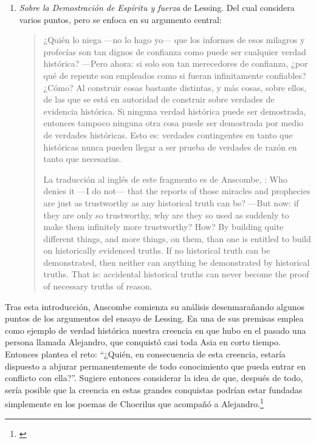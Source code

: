 \begin{enumerate}
{    las palabras de ese profeta o visionario soñador. (Dt 13, 1--4a)}
\item \emph{Sobre la Demostración de Espíritu y fuerza} de Lessing. Del cual
  considera varios puntos, pero se enfoca en su argumento central:
  \blockquote[La traducción al inglés de este fragmento es de Anscombe,
  {\cite[Cf.~][22]{anscombe2008faith:prophandmi}}: Who denies it ---I do not---
  that the reports of those miracles and prophecies are just as trustworthy as
  any historical truth can be? ---But now: if they are only so trustworthy, why
  are they so used as suddenly to make them infinitely more trustworthy? How? By
  building quite different things, and more things, on them, than one is
  entitled to build on historically evidenced truths. If no historical truth can
  be demonstrated, then neither can anything be demonstrated by historical
  truths. That is: accidental historical truths can never become the proof of
  necessary truths of reason.]{¿Quién lo niega ---no lo hago yo--- que los
    informes de esos milagros y profecías son tan dignos de confianza como puede
    ser cualquier verdad histórica? ---Pero ahora: si solo son tan merecedores
    de confianza, ¿por qué de repente son empleados como si fueran infinitamente
    confiables? ¿Cómo? Al construir cosas bastante distintas, y más cosas, sobre
    ellos, de las que se está en autoridad de construir sobre verdades de
    evidencia histórica. Si ninguna verdad histórica puede ser demostrada,
    entonces tampoco ninguna otra cosa puede ser demostrada por medio de
    verdades históricas. Esto es: verdades contingentes en tanto que históricas
    nunca pueden llegar a ser prueba de verdades de razón en tanto que
    necesarias.}
\end{enumerate}

Tras esta introducción, Anscombe comienza su análisis desenmarañando algunos
puntos de los argumentos del ensayo de Lessing. En una de sus premisas emplea
como ejemplo de verdad histórica nuestra creencia en que hubo en el pasado una
persona llamada Alejandro, que conquistó casi toda Asia en corto tiempo.
Entonces plantea el reto: \enquote{¿Quién, en consecuencia de esta creencia,
  estaría dispuesto a abjurar permanentemente de todo conocimiento que pueda
  entrar en conflicto con ella?}. Sugiere entonces considerar la idea de que,
después de todo, sería posible que la creencia en estas grandes conquistas
podrían estar fundadas simplemente en los poemas de Choerilus que acompañó a
Alejandro.\footnote{\cite[Cf.~][448]{lessing1982escritos:demo}}

